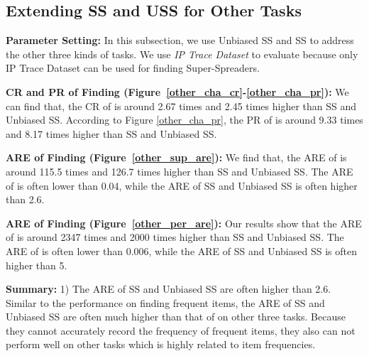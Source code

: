 {\color{reviewD}
\presub
\subsection{Extending SS and USS for Other Tasks} %
\label{eva_other}

\noindent\textbf{Parameter Setting:}
In this subsection, we use Unbiased SS\cite{unbiasedsketch} and SS\cite{spacesaving} to address the other three kinds of tasks.
We use \textit{IP Trace Dataset} to evaluate because only IP Trace Dataset can be used for finding Super-Spreaders.
			



			
\noindent\textbf{CR and PR of Finding \taskfour{} (Figure~\ref{other_cha_cr}-\ref{other_cha_pr}):}
We can find that, the CR of \sketchname{} is around 2.67 times and 2.45 times higher than SS and Unbiased SS. According to Figure \ref{other_cha_pr}, the PR of \sketchname{} is around 9.33 times and 8.17 times higher than SS and Unbiased SS.

\noindent\textbf{ARE of Finding \tasktwo{} (Figure~\ref{other_sup_are}):}
We find that, the ARE of \sketchname{} is around 115.5 times and 126.7 times higher than SS and Unbiased SS. The ARE of \sketchname{} is often lower than 0.04, while the ARE of SS and Unbiased SS is often higher than 2.6.

\noindent\textbf{ARE of Finding \taskthree{} (Figure~\ref{other_per_are}):}
Our results show that the ARE of \sketchname{} is around 2347 times and 2000 times higher than SS and Unbiased SS. The ARE of \sketchname{} is often lower than 0.006, while the ARE of SS and Unbiased SS is often higher than 5.

\noindent\textbf{Summary:}
%
1) 
The ARE of SS and Unbiased SS are often higher than 2.6.
Similar to the performance on finding frequent items, the ARE of SS and Unbiased SS are often much higher than that of \sketchname{} on other three tasks.
Because they cannot accurately record the frequency of frequent items, they also can not perform well on other tasks which is highly related to item frequencies.
}